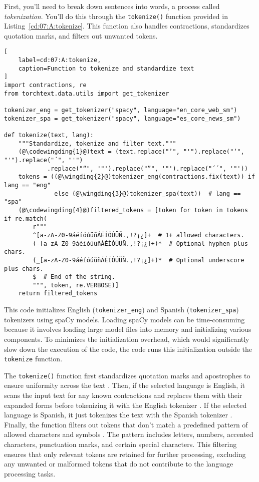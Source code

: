 First, you'll need to break down sentences into words, a process called \emph{tokenization}. You'll do this through the \lstinline{tokenize()} function provided in Listing~\ref{cd:07:A:tokenize}. This function also handles contractions, standardizes quotation marks, and filters out unwanted tokens.
\begin{lstlisting}[
    label=cd:07:A:tokenize,
    caption=Function to tokenize and standardize text
]
import contractions, re
from torchtext.data.utils import get_tokenizer

tokenizer_eng = get_tokenizer("spacy", language="en_core_web_sm")
tokenizer_spa = get_tokenizer("spacy", language="es_core_news_sm")

def tokenize(text, lang):
    """Standardize, tokenize and filter text."""
    (@\codewingding{1}@)text = (text.replace("’", "'").replace("‘", "'").replace("´", "'")
            .replace("“", '"').replace("”", '"').replace("´´", '"'))
    tokens = ((@\wingding{2}@)tokenizer_eng(contractions.fix(text)) if lang == "eng"
              else (@\wingding{3}@)tokenizer_spa(text))  # lang == "spa"
    (@\codewingding{4}@)filtered_tokens = [token for token in tokens if re.match(
        r"""
        ^[a-zA-Z0-9áéíóúüñÁÉÍÓÚÜÑ.,!?¡¿]+  # 1+ allowed characters.
        (-[a-zA-Z0-9áéíóúüñÁÉÍÓÚÜÑ.,!?¡¿]+)*  # Optional hyphen plus chars.
        (_[a-zA-Z0-9áéíóúüñÁÉÍÓÚÜÑ.,!?¡¿]+)*  # Optional underscore plus chars.
        $  # End of the string.
        """, token, re.VERBOSE)]
    return filtered_tokens
\end{lstlisting}
This code initializes English (\lstinline{tokenizer_eng}) and Spanish (\lstinline{tokenizer_spa}) tokenizers using spaCy models. Loading spaCy models can be time-consuming because it involves loading large model files into memory and initializing various components. To minimizes the initialization overhead, which would significantly slow down the execution of the code, the code runs this initialization outside the \lstinline{tokenize} function.

The \lstinline{tokenize()} function first standardizes quotation marks and apostrophes to ensure uniformity across the text .
Then, if the selected language is English, it scans the input text for any known contractions and replaces them with their expanded forms before tokenizing it with the English tokenizer .
If the selected language is Spanish, it just tokenizes the text with the Spanish tokenizer .
Finally, the function filters out tokens that don't match a predefined pattern of allowed characters and symbols .  The pattern includes letters, numbers, accented characters, punctuation marks, and certain special characters. This filtering ensures that only relevant tokens are retained for further processing, excluding any unwanted or malformed tokens that do not contribute to the language processing tasks.

